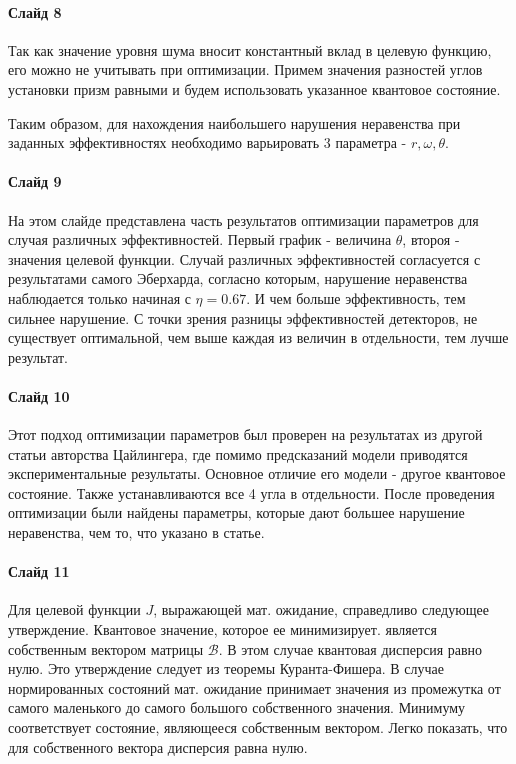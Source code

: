 \documentclass[11pt]{article}
\begin{document}
\paragraph{Слайд 8}
Так как значение уровня шума вносит константный вклад в целевую функцию, его можно не учитывать при оптимизации. Примем значения разностей углов установки призм равными и будем использовать указанное квантовое состояние.

Таким образом, для нахождения наибольшего нарушения неравенства при заданных эффективностях необходимо варьировать 3 параметра - $r, \omega, \theta$.

\paragraph{Слайд 9}
На этом слайде представлена часть результатов оптимизации параметров для случая различных эффективностей. Первый график - величина $\theta$, второя - значения целевой функции. Случай различных эффективностей согласуется с результатами самого Эберхарда, согласно которым, нарушение неравенства наблюдается только начиная с $\eta = 0.67$. И чем больше эффективность, тем сильнее нарушение. С точки зрения разницы эффективностей детекторов, не существует оптимальной, чем выше каждая из величин в отдельности, тем лучше результат.

\paragraph{Слайд 10}
Этот подход оптимизации параметров был проверен на результатах из другой статьи авторства Цайлингера, где помимо предсказаний модели приводятся экспериментальные результаты. Основное отличие его модели - другое квантовое состояние. Также устанавливаются все 4 угла в отдельности. После проведения оптимизации были найдены параметры, которые дают большее нарушение неравенства, чем то, что указано в статье.

\paragraph{Слайд 11}
Для целевой функции $J$, выражающей мат. ожидание, справедливо следующее утверждение. Квантовое значение, которое ее минимизирует. является собственным вектором матрицы $\mathcal{B}$. В этом случае квантовая дисперсия равно нулю. Это утверждение следует из теоремы Куранта-Фишера. В случае нормированных состояний мат. ожидание принимает значения из промежутка от самого маленького до самого большого собственного значения. Минимуму соответствует состояние, являющееся собственным вектором. Легко показать, что для собственного вектора дисперсия равна нулю. 
\end{document}
